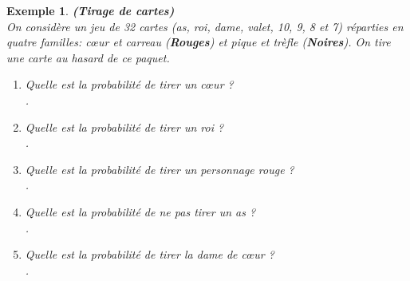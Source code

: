 \documentclass[a4paper,10.5pt]{article}
\newtheorem{prop}{Propriété}
\newtheorem{ex}{Exemple}
\begin{document}
\newpage
\begin{ex}
	\textbf{(Tirage de cartes)}\\[0.25cm]
	On considère un jeu de 32 cartes (as, roi, dame, valet, 10, 9, 8 et 7) réparties en quatre familles: cœur et carreau (\textbf{Rouges}) et pique et trèfle (\textbf{Noires}). On tire une carte au hasard de ce paquet.  \\[0.2cm]
	\begin{enumerate}
		\item Quelle est la probabilité de tirer un cœur ?\\[0.5cm]
		.\dotfill \\[0.15cm]
		\item Quelle est la probabilité de tirer un roi ?\\[0.5cm]
		.\dotfill \\[0.15cm]
		\item Quelle est la probabilité de tirer un personnage rouge ?\\[0.5cm]
		.\dotfill \\[0.15cm]
		\item Quelle est la probabilité de ne pas tirer un as ?\\[0.5cm]
		.\dotfill \\[0.15cm]
		\item Quelle est la probabilité de tirer la dame de cœur ? \\[0.5cm]
		.\dotfill \\[0.15cm]
	\end{enumerate}

\end{ex}
\medskip
\noindent{}
\hfill\\[0.1cm]
\end{document}
